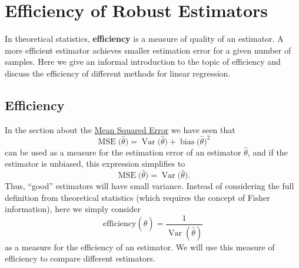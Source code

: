 \documentclass[
  a4paper,
]{article}
\theoremstyle{definition}
\theoremstyle{definition}
\theoremstyle{definition}
\theoremstyle{definition}
\theoremstyle{remark}
\begin{document}
\clearpage

\section{Efficiency of Robust Estimators}\label{S19-efficiency}

In theoretical statistics, \textbf{efficiency} is a measure of quality of an
estimator. A more efficient estimator achieves smaller estimation error
for a given number of samples. Here we give an informal introduction
to the topic of efficiency and discuss the efficiency of different
methods for linear regression.

\subsection{Efficiency}\label{efficiency}

In the section about the \hyperref[mean-squared-error]{Mean Squared Error} we have seen that
\begin{equation*}
  \mathop{\mathrm{MSE}}\nolimits\bigl( \hat\theta \bigr)
  = \mathop{\mathrm{Var}}\bigl( \hat\theta \bigr) + \mathop{\mathrm{bias}}\bigl( \hat\theta \bigr)^2
\end{equation*}
can be used as a measure for the estimation error of an estimator \(\hat\theta\),
and if the estimator is unbiased, this expression simplifies to
\begin{equation*}
  \mathop{\mathrm{MSE}}\nolimits\bigl( \hat\theta \bigr)
  = \mathop{\mathrm{Var}}\bigl( \hat\theta \bigr).
\end{equation*}
Thus, ``good'' estimators will have small variance.
Instead of considering the full definition from theoretical statistics
(which requires the concept of Fisher information), here we simply consider
\begin{equation*}
  \mathrm{efficiency}(\hat\theta)
  = \frac{1}{\mathop{\mathrm{Var}}(\hat\theta)}
\end{equation*}
as a measure for the efficiency of an estimator. We will use this measure
of efficiency to compare different estimators.
\end{document}
